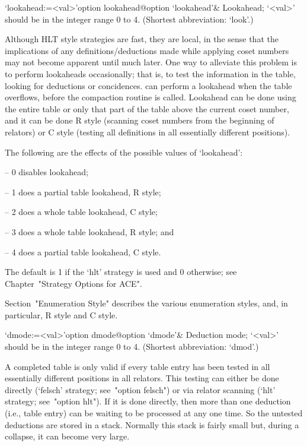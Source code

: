 \>`lookahead:=<val>'{option lookahead}@{option `lookahead'}&
Lookahead; `<val>' should be in the integer range 0 to 4.
(Shortest abbreviation: `look'.)
  
Although HLT style strategies are fast, they are local, in  the  sense
that  the  implications  of  any  definitions/deductions  made   while
applying coset numbers may not become apparent until much  later.  One
way to alleviate this problem is to perform  lookaheads  occasionally;
that is, to test the information in the table, looking for  deductions
or  concidences.  {\ACE}  can  perform  a  lookahead  when  the  table
overflows, before the compaction routine is called. Lookahead  can  be
done using the entire table or only that part of the table  above  the
current coset number, and it  can  be  done  R style  (scanning  coset
numbers from the  beginning  of  relators)  or  C style  (testing  all
definitions in all essentially different positions).

The following are the effects of the possible values of `lookahead':

\beginlist

\item{--} 0 disables lookahead;
\item{--} 1 does a partial table lookahead, R style; 
\item{--} 2 does a whole table lookahead, C style; 
\item{--} 3 does a whole table lookahead, R style; and
\item{--} 4 does a partial table lookahead, C style.  

\endlist

The default is 1 if the `hlt' strategy is used and  0  otherwise;  see
Chapter~"Strategy Options for ACE".

Section~"Enumeration Style" describes the various enumeration  styles,
and, in particular, R style and C style.

\enditems


\beginitems

\>`dmode:=<val>'{option dmode}@{option `dmode'}&
Deduction mode; `<val>' should be in the integer range 0 to 4.
(Shortest abbreviation: `dmod'.)

A completed table  is only valid if every table  entry has been tested
in all essentially different  positions in all relators.  This testing
can either be done directly (`felsch' strategy;  see~"option  felsch")
or via relator scanning (`hlt' strategy; see~"option hlt"). If  it  is
done directly, then more than one deduction (i.e., table entry) can be
waiting to be processed at any one time. So  the  untested  deductions
are stored in a stack. Normally this stack is fairly small but, during
a collapse, it can become very large.

